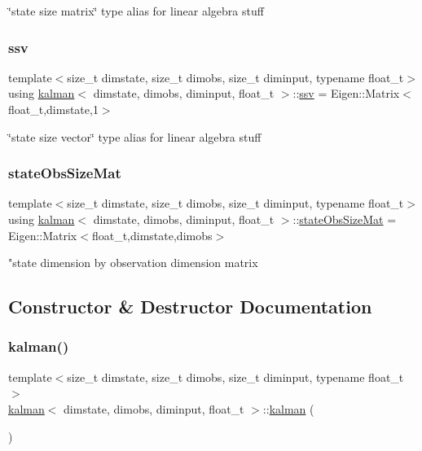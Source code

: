 \char`\"{}state size matrix\char`\"{} type alias for linear algebra stuff \mbox{\label{classkalman_a732cf05b5ddd106cfdafc324d03f756e}} 
\subsubsection{\texorpdfstring{ssv}{ssv}}
{\footnotesize\ttfamily template$<$size\+\_\+t dimstate, size\+\_\+t dimobs, size\+\_\+t diminput, typename float\+\_\+t$>$ \\
using \hyperlink{classkalman}{kalman}$<$ dimstate, dimobs, diminput, float\+\_\+t $>$\+::\hyperlink{classcf__filter_ad4bce534d6b7a494dae851846037c94b}{ssv} =  Eigen\+::\+Matrix$<$float\+\_\+t,dimstate,1$>$}

\char`\"{}state size vector\char`\"{} type alias for linear algebra stuff \mbox{\label{classkalman_a44779d7ee7b8c12ca08e9dac4112906c}} 
\subsubsection{\texorpdfstring{state\+Obs\+Size\+Mat}{stateObsSizeMat}}
{\footnotesize\ttfamily template$<$size\+\_\+t dimstate, size\+\_\+t dimobs, size\+\_\+t diminput, typename float\+\_\+t$>$ \\
using \hyperlink{classkalman}{kalman}$<$ dimstate, dimobs, diminput, float\+\_\+t $>$\+::\hyperlink{classkalman_a44779d7ee7b8c12ca08e9dac4112906c}{state\+Obs\+Size\+Mat} =  Eigen\+::\+Matrix$<$float\+\_\+t,dimstate,dimobs$>$}

"state dimension by observation dimension matrix 

\subsection{Constructor \& Destructor Documentation}
\mbox{\label{classkalman_a8b05d79f154bf5669457a3e95f7323d5}} 
\subsubsection{\texorpdfstring{kalman()}{kalman()}\hspace{0.1cm}{\footnotesize\ttfamily [1/2]}}
{\footnotesize\ttfamily template$<$size\+\_\+t dimstate, size\+\_\+t dimobs, size\+\_\+t diminput, typename float\+\_\+t $>$ \\
\hyperlink{classkalman}{kalman}$<$ dimstate, dimobs, diminput, float\+\_\+t $>$\+::\hyperlink{classkalman}{kalman} (\begin{DoxyParamCaption}{ }\end{DoxyParamCaption})}



